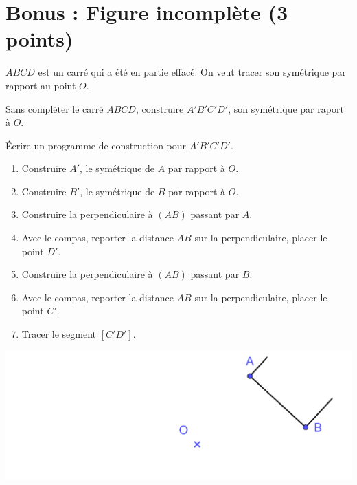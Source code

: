\section{Bonus : Figure incomplète (3 points) }

$ABCD$ est un carré qui a été en partie effacé. On veut tracer son symétrique par rapport au point $O$.

\begin{questions}
	\question[1] Sans compléter le carré $ABCD$, construire $A'B'C'D'$, son symétrique par raport à $O$.
	
	\question[2] \'Ecrire un programme de construction pour $A'B'C'D'$.
	\begin{solution}
		\begin{enumerate}
			\item Construire $A'$, le symétrique de $A$ par rapport à $O$.
			\item Construire $B'$, le symétrique de $B$ par rapport à $O$.
			\item Construire la perpendiculaire à $(AB)$ passant par $A$.
			\item Avec le compas, reporter la distance $AB$ sur la perpendiculaire, placer le point $D'$.
			\item Construire la perpendiculaire à $(AB)$ passant par $B$.
			\item Avec le compas, reporter la distance $AB$ sur la perpendiculaire, placer le point $C'$.
			\item Tracer le segment $[C'D']$.
		\end{enumerate}
	\end{solution}
	
	
	\begin{center}
		\includegraphics[scale=0.3]{img/carre}
	\end{center}


\end{questions}
